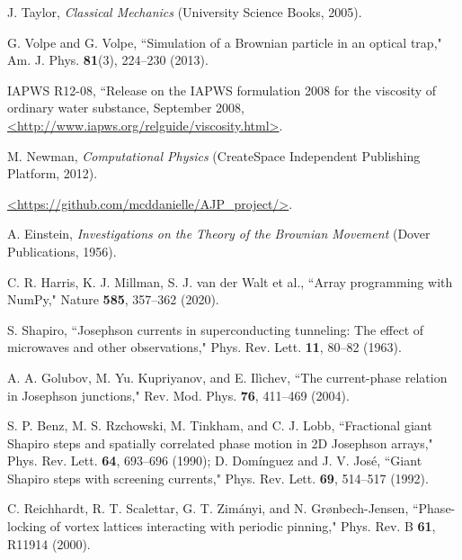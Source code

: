 \documentclass[preprint,showpacs,preprintnumbers,amsmath,amssymb,aps,prb]{revtex4-1}
\theoremstyle{remark}
\begin{document}
\begin{thebibliography}{99}
   J. Taylor,  {\it Classical Mechanics} (University Science Books, 2005).

   G. Volpe and G. Volpe, ``Simulation of a Brownian particle in an optical trap,"  Am. J. Phys. {\bf 81}(3), 224--230 (2013).

    IAPWS R12-08, 
    ``Release on the IAPWS formulation 2008 for the viscosity of ordinary water substance,  September 2008,
    \url{<http://www.iapws.org/relguide/viscosity.html>}.

   M. Newman, {\it Computational Physics} (CreateSpace Independent Publishing Platform, 2012).

    \url{<https://github.com/mcddanielle/AJP_project/>}.

   A. Einstein, {\it Investigations on the Theory of the Brownian Movement}  (Dover Publications, 1956).

     C. R. Harris, K. J. Millman, S. J. van der Walt et al.,  ``Array programming with NumPy,"  Nature {\bf 585}, 357--362 (2020). %
      
     S. Shapiro, ``Josephson currents in superconducting tunneling: The effect of microwaves and other observations," Phys. Rev. Lett. {\bf 11}, 80--82 (1963).

     A. A. Golubov, M. Yu. Kupriyanov, and E. Il{\`i}chev, ``The current-phase relation in Josephson junctions," Rev. Mod. Phys. {\bf 76}, 411--469 (2004).

      S. P. Benz, M. S. Rzchowski, M. Tinkham, and C. J. Lobb, ``Fractional giant Shapiro steps and spatially correlated phase motion in 2D Josephson arrays," Phys. Rev. Lett. {\bf 64}, 693--696 (1990); D. Dom{\'i}nguez and J. V. Jos{\'e}, ``Giant Shapiro steps with screening currents," Phys. Rev. Lett. {\bf 69}, 514--517 (1992).

     C. Reichhardt, R. T. Scalettar, G. T. Zim{\'a}nyi, and N. Gr{\o}nbech-Jensen,  ``Phase-locking of vortex lattices interacting with periodic pinning,"  Phys. Rev. B {\bf 61}, R11914 (2000).
     

\end{thebibliography}
\end{document}
